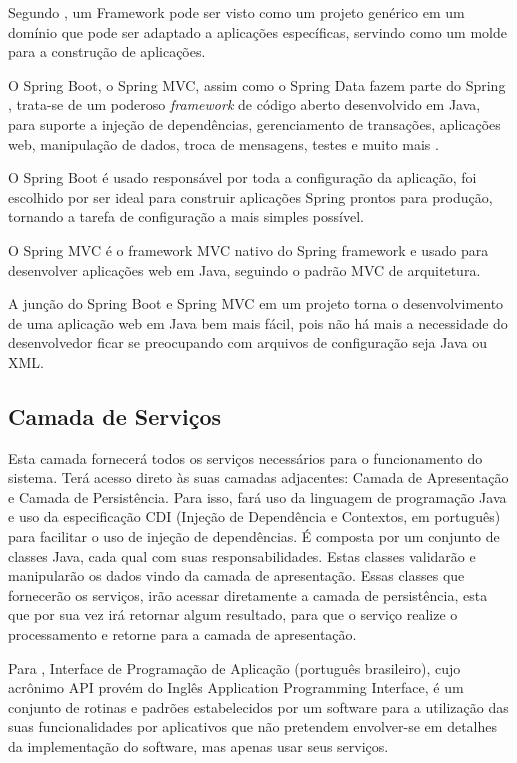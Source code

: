 \documentclass[a4paper,12pt]{monografia}
\begin{document}
Segundo , um Framework pode ser visto como um projeto genérico em um domínio que pode ser adaptado a aplicações específicas, servindo como um molde para a construção de aplicações.

O Spring Boot, o Spring MVC, assim como o Spring Data fazem parte do Spring , trata-se de um poderoso \textit{framework}  de código aberto desenvolvido em Java, para suporte a injeção de dependências, gerenciamento de transações, aplicações web, manipulação de dados, troca de mensagens, testes e muito mais \cite{Spring}. 

O Spring Boot é usado responsável por toda a configuração da aplicação, foi escolhido por ser ideal para construir aplicações Spring prontos para produção, tornando a tarefa de configuração a mais simples possível. 

O Spring MVC é o framework MVC nativo do Spring framework e usado para desenvolver aplicações web em Java, seguindo o padrão MVC de arquitetura.

A junção do Spring Boot e Spring MVC em um projeto torna o desenvolvimento de uma aplicação web em Java bem mais fácil, pois não há mais a necessidade do desenvolvedor ficar se preocupando com arquivos de configuração seja Java ou XML.

\subsection{Camada de Serviços} %
\label{sub:camada_de_servicos}

Esta camada fornecerá todos os serviços necessários para o funcionamento do sistema. Terá acesso direto às suas camadas adjacentes: Camada de Apresentação e Camada de Persistência. Para isso, fará uso da linguagem de programação Java e uso da especificação CDI (Injeção de Dependência e Contextos, em português) para facilitar o uso de injeção de dependências. É composta por um conjunto de classes Java, cada qual com suas responsabilidades. Estas classes validarão e manipularão os dados vindo da camada de apresentação. Essas classes que fornecerão os serviços, irão acessar diretamente a camada de persistência, esta que por sua vez irá retornar algum resultado, para que o serviço realize o processamento e retorne para a camada de apresentação.

Para , Interface de Programação de Aplicação (português brasileiro), cujo acrônimo API provém do Inglês Application Programming Interface, é um conjunto de rotinas e padrões estabelecidos por um software para a utilização das suas funcionalidades por aplicativos que não pretendem envolver-se em detalhes da implementação do software, mas apenas usar seus serviços.
\end{document}
